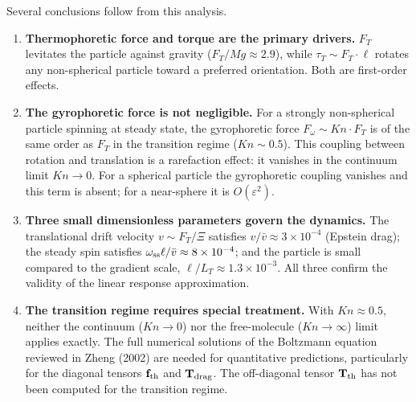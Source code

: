 \documentclass[11pt]{article}
\begin{document}
Several conclusions follow from this analysis.
\begin{enumerate}
  \item \textbf{Thermophoretic force and torque are the primary drivers.} $F_T$ levitates the particle against gravity ($F_T/Mg\approx2.9$), while $\tau_T\sim F_T\cdot\ell$ rotates any non-spherical particle toward a preferred orientation. Both are first-order effects.
  \item \textbf{The gyrophoretic force is not negligible.} For a strongly non-spherical particle spinning at steady state, the gyrophoretic force $F_\omega\sim Kn\cdot F_T$ is of the same order as $F_T$ in the transition regime ($Kn\sim0.5$). This coupling between rotation and translation is a rarefaction effect: it vanishes in the continuum limit $Kn\to0$. For a spherical particle the gyrophoretic coupling vanishes and this term is absent; for a near-sphere it is $O(\varepsilon^2)$.
  \item \textbf{Three small dimensionless parameters govern the dynamics.} The translational drift velocity $v\sim F_T/\Xi$ satisfies $v/\bar v\approx3\times10^{-4}$ (Epstein drag); the steady spin satisfies $\omega_{\rm ss}\ell/\bar v\approx8\times10^{-4}$; and the particle is small compared to the gradient scale, $\ell/L_T\approx1.3\times10^{-3}$. All three confirm the validity of the linear response approximation.
  \item \textbf{The transition regime requires special treatment.} With $Kn\approx0.5$, neither the continuum ($Kn\to0$) nor the free-molecule ($Kn\to\infty$) limit applies exactly. The full numerical solutions of the Boltzmann equation reviewed in Zheng (2002) are needed for quantitative predictions, particularly for the diagonal tensors $\mathbf f_{\rm th}$ and $\mathbf T_{\rm drag}$. The off-diagonal tensor $\mathbf T_{\rm th}$ has not been computed for the transition regime.
\end{enumerate}
\end{document}
